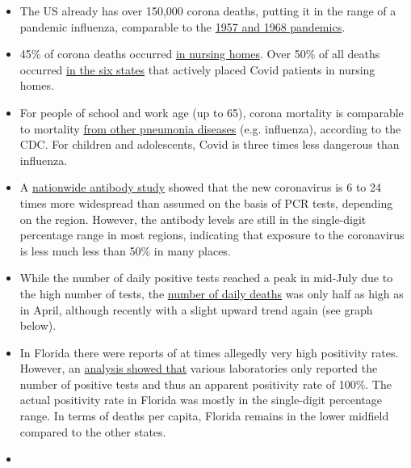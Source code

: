 \begin{itemize}
\tightlist
\item
  The US already has over 150,000 corona deaths, putting it in the range
  of a pandemic influenza, comparable to the
  \href{https://www.visualcapitalist.com/history-of-pandemics-deadliest/}{1957
  and 1968 pandemics}.
\item
  45\% of corona deaths occurred
  \href{https://freopp.org/the-covid-19-nursing-home-crisis-by-the-numbers-3a47433c3f70}{in
  nursing homes}. Over 50\% of all deaths occurred
  \href{https://twitter.com/pdubdev/status/1280195926238261248/photo/1}{in
  the six states} that actively placed Covid patients in nursing homes.
\item
  For people of school and work age (up to 65), corona mortality is
  comparable to mortality
  \href{https://childrenshealthdefense.org/news/if-covid-fatalities-were-90-2-lower-how-would-you-feel-about-schools-reopening/}{from
  other pneumonia diseases} (e.g. influenza), according to the CDC. For
  children and adolescents, Covid is three times less dangerous than
  influenza.
\item
  A
  \href{https://www.the-scientist.com/news-opinion/largest-seroprevalence-study-in-us-shows-vast-covid-19-undercount-67762}{nationwide
  antibody study} showed that the new coronavirus is 6 to 24 times more
  widespread than assumed on the basis of PCR tests, depending on the
  region. However, the antibody levels are still in the single-digit
  percentage range in most regions, indicating that exposure to the
  coronavirus is less much less than 50\% in many places.
\item
  While the number of daily positive tests reached a peak in mid-July
  due to the high number of tests, the
  \href{https://covidusa.net/}{number of daily deaths} was only half as
  high as in April, although recently with a slight upward trend again
  (see graph below).
\item
  In Florida there were reports of at times allegedly very high
  positivity rates. However, an
  \href{https://www.fox35orlando.com/news/fox-35-investigates-florida-department-of-health-says-some-labs-have-not-reported-negative-covid-19-results}{analysis
  showed that} various laboratories only reported the number of positive
  tests and thus an apparent positivity rate of 100\%. The actual
  positivity rate in Florida was mostly in the single-digit percentage
  range. In terms of deaths per capita, Florida remains in the lower
  midfield compared to the other states.
\item

\end{itemize}
